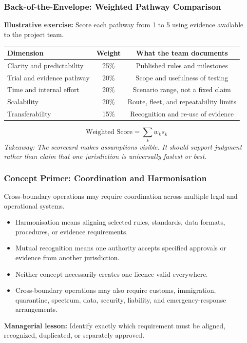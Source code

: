 \documentclass{beamer}
\begin{document}
\begin{frame}[t]
\frametitle{Back-of-the-Envelope: Weighted Pathway Comparison}
\textbf{Illustrative exercise:} Score each pathway from 1 to 5 using evidence available to the project team.
\begin{center}\small
\begin{tabular}{l|c|c}
\textbf{Dimension} & \textbf{Weight} & \textbf{What the team documents}\\
\hline
Clarity and predictability & 25\% & Published rules and milestones\\
Trial and evidence pathway & 20\% & Scope and usefulness of testing\\
Time and internal effort & 20\% & Scenario range, not a fixed claim\\
Scalability & 20\% & Route, fleet, and repeatability limits\\
Transferability & 15\% & Recognition and re-use of evidence\\
\end{tabular}
\end{center}
\[
\text{Weighted Score}=\sum_k w_k s_k
\]
\textit{Takeaway: The scorecard makes assumptions visible. It should support judgment rather than claim that one jurisdiction is universally fastest or best.}
\end{frame}

\begin{frame}[t]
\frametitle{Concept Primer: Coordination and Harmonisation}
Cross-boundary operations may require coordination across multiple legal and operational systems.
\begin{itemize}
\item Harmonisation means aligning selected rules, standards, data formats, procedures, or evidence requirements.
\item Mutual recognition means one authority accepts specified approvals or evidence from another jurisdiction.
\item Neither concept necessarily creates one licence valid everywhere.
\item Cross-boundary operations may also require customs, immigration, quarantine, spectrum, data, security, liability, and emergency-response arrangements.
\end{itemize}
\textbf{Managerial lesson:} Identify exactly which requirement must be aligned, recognized, duplicated, or separately approved.
\end{frame}
\end{document}
